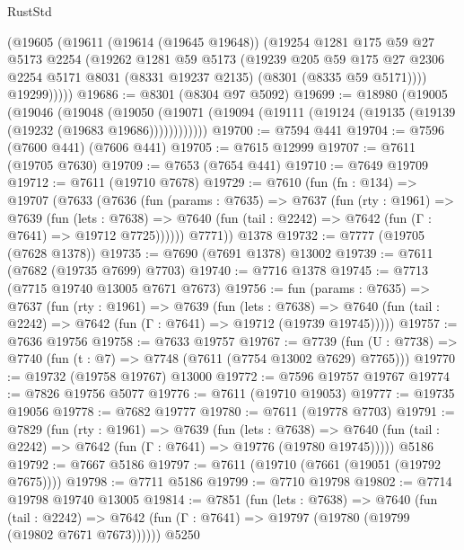 \begin{lexlean}{RustStd}
\begin{coremodule}
{\begin{coremodule}
{{{{{{{{{{{{{{{{{{{{{{{{{{{{{{{{{{        (@19605
          (@19611
            (@19614 (@19645 @19648))
            (@19254
              @1281
              @175
              @59
              @27
              @5173
              @2254
              (@19262
                @1281
                @59
                @5173
                (@19239
                  @205
                  @59
                  @175
                  @27
                  @2306
                  @2254
                  @5171
                  @8031
                  (@8331 @19237 @2135)
                  (@8301 (@8335 @59 @5171))))
              @19299)))))
@19686 := @8301 (@8304 @97 @5092)
@19699 := @18980
    (@19005
      (@19046
        (@19048
          (@19050 (@19071 (@19094 (@19111 (@19124 (@19135 (@19139 (@19232 (@19683 @19686))))))))))))
@19700 := @7594 @441
@19704 := @7596 (@7600 @441) (@7606 @441)
@19705 := @7615 @12999
@19707 := @7611 (@19705 @7630)
@19709 := @7653 (@7654 @441)
@19710 := @7649 @19709
@19712 := @7611 (@19710 @7678)
@19729 := @7610
    (fun (fn : @134) =>
    @19707
      (@7633
        (@7636
          (fun (params : @7635) =>
          @7637
            (fun (rty : @1961) =>
            @7639
              (fun (lets : @7638) =>
              @7640 (fun (tail : @2242) => @7642 (fun (Γ : @7641) => @19712 @7725))))))
        @7771))
    @1378
@19732 := @7777 (@19705 (@7628 @1378))
@19735 := @7690 (@7691 @1378) @13002
@19739 := @7611 (@7682 (@19735 @7699) @7703)
@19740 := @7716 @1378
@19745 := @7713 (@7715 @19740 @13005 @7671 @7673)
@19756 := fun (params : @7635) =>
  @7637
    (fun (rty : @1961) =>
    @7639
      (fun (lets : @7638) =>
      @7640 (fun (tail : @2242) => @7642 (fun (Γ : @7641) => @19712 (@19739 @19745)))))
@19757 := @7636 @19756
@19758 := @7633 @19757
@19767 := @7739
    (fun (U : @7738) => @7740 (fun (t : @7) => @7748 (@7611 (@7754 @13002 @7629) @7765)))
@19770 := @19732 (@19758 @19767) @13000
@19772 := @7596 @19757 @19767
@19774 := @7826 @19756 @5077
@19776 := @7611 (@19710 @19053)
@19777 := @19735 @19056
@19778 := @7682 @19777
@19780 := @7611 (@19778 @7703)
@19791 := @7829
    (fun (rty : @1961) =>
    @7639
      (fun (lets : @7638) =>
      @7640 (fun (tail : @2242) => @7642 (fun (Γ : @7641) => @19776 (@19780 @19745)))))
    @5186
@19792 := @7667 @5186
@19797 := @7611 (@19710 (@7661 (@19051 (@19792 @7675))))
@19798 := @7711 @5186
@19799 := @7710 @19798
@19802 := @7714 @19798 @19740 @13005
@19814 := @7851
    (fun (lets : @7638) =>
    @7640
      (fun (tail : @2242) =>
      @7642 (fun (Γ : @7641) => @19797 (@19780 (@19799 (@19802 @7671 @7673))))))
    @5250
}}}}}}}}}}}}}}}}}}}}}}}}}}}}}}}}}}
\end{coremodule}}
\end{coremodule}
\end{lexlean}

